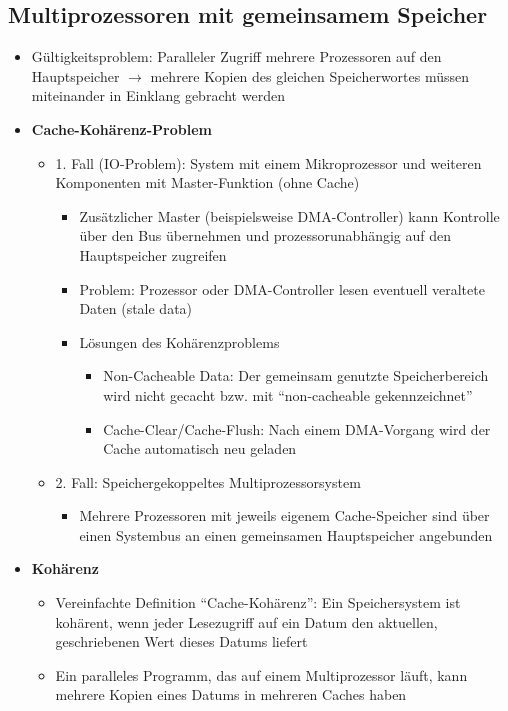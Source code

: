 \subsection{Multiprozessoren mit gemeinsamem Speicher}
\begin{itemize}
	\item Gültigkeitsproblem: Paralleler Zugriff mehrere Prozessoren auf den Hauptspeicher \(\rightarrow\) mehrere Kopien des gleichen Speicherwortes müssen miteinander in Einklang gebracht werden
	\item \textbf{Cache-Kohärenz-Problem}
	\begin{itemize}
		\item 1. Fall (IO-Problem): System mit einem Mikroprozessor und weiteren Komponenten mit Master-Funktion (ohne Cache)
		\begin{itemize}
			\item Zusätzlicher Master (beispielsweise DMA-Controller) kann Kontrolle über den Bus übernehmen und prozessorunabhängig auf den Hauptspeicher zugreifen
			\item Problem: Prozessor oder DMA-Controller lesen eventuell veraltete Daten (stale data)
			\item Lösungen des Kohärenzproblems
			\begin{itemize}
				\item Non-Cacheable Data: Der gemeinsam genutzte Speicherbereich wird nicht gecacht bzw. mit "`non-cacheable gekennzeichnet"'
				\item Cache-Clear/Cache-Flush: Nach einem DMA-Vorgang wird der Cache automatisch neu geladen
			\end{itemize}
		\end{itemize}
		\item 2. Fall: Speichergekoppeltes Multiprozessorsystem
		\begin{itemize}
			\item Mehrere Prozessoren mit jeweils eigenem Cache-Speicher sind über einen Systembus an einen gemeinsamen Hauptspeicher angebunden
		\end{itemize}
	\end{itemize}
	\item \textbf{Kohärenz}
	\begin{itemize}
		\item Vereinfachte Definition "`Cache-Kohärenz"': Ein Speichersystem ist kohärent, wenn jeder Lesezugriff auf ein Datum den aktuellen, geschriebenen Wert dieses Datums liefert
		\item Ein paralleles Programm, das auf einem Multiprozessor läuft, kann mehrere Kopien eines Datums in mehreren Caches haben

\end{itemize}
\end{itemize}
